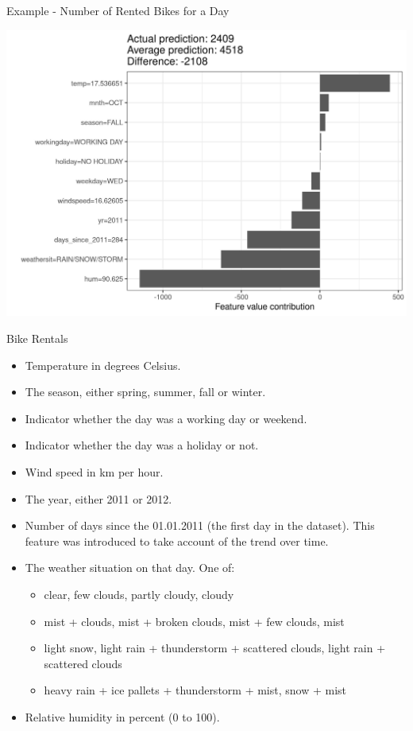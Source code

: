 \documentclass[dvipsnames]{beamer}
\begin{document}
\begin{frame}{Example - Number of Rented Bikes for a Day}
	\begin{center}
		\includegraphics[scale=0.6]{images/shapley-bike-plot-1.jpeg}
	\end{center}
\end{frame}

\begin{frame}{Bike Rentals}
	\begin{itemize}
		\item Temperature in degrees Celsius.
		\item The season, either spring, summer, fall or winter.
		\item Indicator whether the day was a working day or weekend.
		\item Indicator whether the day was a holiday or not.
		\item Wind speed in km per hour.
		\item The year, either 2011 or 2012.
		\item Number of days since the 01.01.2011 (the first day in the dataset). This feature was introduced to take account of the trend over time.
		\item The weather situation on that day. One of:
		\begin{itemize}
			\item clear, few clouds, partly cloudy, cloudy
			\item mist + clouds, mist + broken clouds, mist + few clouds, mist
			\item light snow, light rain + thunderstorm + scattered clouds, light rain + scattered clouds
			\item heavy rain + ice pallets + thunderstorm + mist, snow + mist
		\end{itemize}
		\item Relative humidity in percent (0 to 100).
	\end{itemize}
\end{frame}
\end{document}
